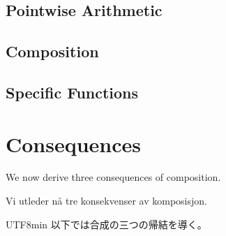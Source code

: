 \documentclass{axiom}
\begin{document}
\subsection{Pointwise Arithmetic}

\begin{definition}[Sum]\label{d:sum}
\end{definition}

\begin{definition}[Difference]\label{d:difference}
\end{definition}

\begin{definition}[Product]\label{d:product}
\end{definition}

\begin{definition}[Quotient]\label{d:quotient}
\end{definition}

\subsection{Composition}

\begin{definition}[Composition]\label{d:composition}
\end{definition}

\subsection{Specific Functions}

\begin{definition}\label{d:identity}
\end{definition}

\begin{definition}\label{d:characteristic}
\end{definition}

\newpage
\section{Consequences}
\noindent We now derive three consequences of composition.

\noindent Vi utleder nå tre konsekvenser av komposisjon.

\begin{CJK}{UTF8}{min}
\noindent 以下では合成の三つの帰結を導く。
\end{CJK}
\end{document}
